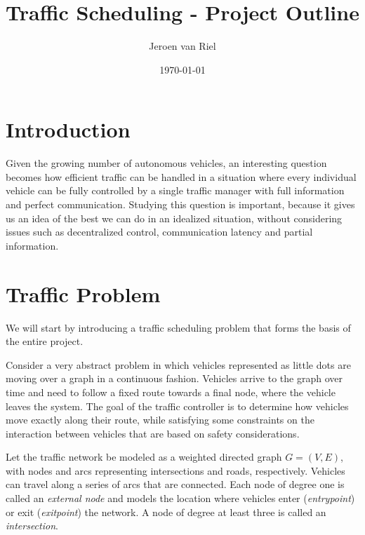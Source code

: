 \documentclass{article}
\title{Traffic Scheduling - Project Outline}
\author{Jeroen van Riel}
\date{\monthyeardate\today}
\theoremstyle{definition}
\theoremstyle{plain}
\begin{document}
\maketitle




\section{Introduction}

Given the growing number of autonomous vehicles, an interesting question becomes
how efficient traffic can be handled in a situation where every individual
vehicle can be fully controlled by a single traffic manager with full
information and perfect communication. Studying this question is important,
because it gives us an idea of the best we can do in an idealized situation,
without considering issues such as decentralized control, communication latency
and partial information.


\section{Traffic Problem}

We will start by introducing a traffic scheduling problem that forms the basis
of the entire project.

Consider a very abstract problem in which vehicles
represented as little dots are moving over a graph in a continuous fashion.
Vehicles arrive to the graph over time and need to follow a fixed route towards
a final node, where the vehicle leaves the system. The goal of the traffic
controller is to determine how vehicles move exactly along their route, while
satisfying some constraints on the interaction between vehicles that are based
on safety considerations.

Let the traffic network be modeled as a weighted directed graph $G=(V,E)$, with
nodes and arcs representing intersections and roads, respectively. Vehicles can
travel along a series of arcs that are connected. Each node of degree one is
called an \textit{external node} and models the location where vehicles enter
(\textit{entrypoint}) or exit (\textit{exitpoint}) the network. A node of degree
at least three is called an \textit{intersection}.
\end{document}
